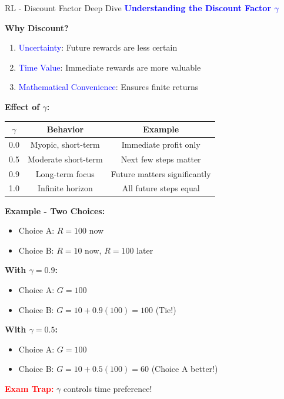 \documentclass[8pt]{beamer}
\begin{document}
	\begin{frame}{RL - Discount Factor Deep Dive}
		\fontsize{6.5}{7.5}\selectfont
		\textcolor{blue}{\textbf{Understanding the Discount Factor $\gamma$}}
		
		\textbf{Why Discount?}
		\begin{enumerate}
			\item \textcolor{blue}{Uncertainty}: Future rewards are less certain
			\item \textcolor{blue}{Time Value}: Immediate rewards are more valuable
			\item \textcolor{blue}{Mathematical Convenience}: Ensures finite returns
		\end{enumerate}
		
		\textbf{Effect of $\gamma$:}
		\begin{tabular}{|c|c|c|}
			\hline
			$\gamma$ & Behavior & Example \\
			\hline
			0.0 & Myopic, short-term & Immediate profit only \\
			\hline
			0.5 & Moderate short-term & Next few steps matter \\
			\hline
			0.9 & Long-term focus & Future matters significantly \\
			\hline
			1.0 & Infinite horizon & All future steps equal \\
			\hline
		\end{tabular}
		
		\textbf{Example - Two Choices:}
		\begin{itemize}
			\item Choice A: $R = 100$ now
			\item Choice B: $R = 10$ now, $R = 100$ later
		\end{itemize}
		
		\textbf{With $\gamma = 0.9$:}
		\begin{itemize}
			\item Choice A: $G = 100$
			\item Choice B: $G = 10 + 0.9(100) = 100$ (Tie!)
		\end{itemize}
		
		\textbf{With $\gamma = 0.5$:}
		\begin{itemize}
			\item Choice A: $G = 100$
			\item Choice B: $G = 10 + 0.5(100) = 60$ (Choice A better!)
		\end{itemize}
		
		\textcolor{red}{\textbf{Exam Trap:}} $\gamma$ controls time preference!
	\end{frame}
	
\end{document}
